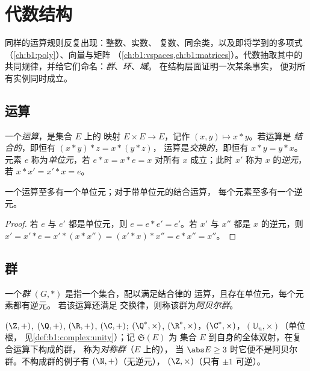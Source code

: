 \chapter{代数结构}\label{ch:b1:structures}

同样的运算规则反复出现：整数、实数、
复数、同余类，以及即将学到的多项式
（\cref{ch:b1:poly}）、向量与矩阵
（\cref{ch:b1:vspaces,ch:b1:matrices}）。代数抽取其中的
共同规律，并给它们命名：\emph{群}、\emph{环}、\emph{域}。
在结构层面证明一次某条事实，
便对所有实例同时成立。

\section{运算}

\begin{definition}\label{def:b1:structures:law}
一个\emph{运算}，是集合 $E$ 上的
映射 $E \times E \to E$，记作 $(x, y) \mapsto x * y$。若运算是
\emph{结合的}，即恒有 $(x*y)*z = x*(y*z)$，
运算是\emph{交换的}，即恒有 $x * y = y * x$。元素 $e$ 称为\emph{单位元}，若
$e * x = x * e = x$ 对所有 $x$ 成立；此时 $x'$ 称为 $x$ 的\emph{逆元}，若
$x * x' = x' * x = e$。
\end{definition}

\begin{proposition}[唯一性]\label{prop:b1:structures:unique}
一个运算至多有一个单位元；对于带单位元的结合运算，
每个元素至多有一个逆元。
\end{proposition}

\begin{proof}
若 $e$ 与 $e'$ 都是单位元，则 $e = e * e' = e'$。若 $x'$ 与 $x''$
都是 $x$ 的逆元，则 $x' = x' * e = x' * (x * x'') = (x' * x) * x'' = e * x''
= x''$。
\end{proof}

\section{群}

\begin{definition}[群]\label{def:b1:structures:group}
一个\emph{群} $(G, *)$ 是指一个集合，配以满足结合律的
运算，且存在单位元，每个元素都有逆元。
若该运算还满足
交换律，则称该群为\emph{阿贝尔群}。
\end{definition}

\begin{example}\label{ex:b1:structures:groups}
$(\Z, +)$, $(\Q, +)$, $(\R, +)$, $(\C, +)$; $(\Q^*, \times)$,
$(\R^*, \times)$，$(\C^*, \times)$，$(\mathbb{U}_n, \times)$（单位根，
见\cref{def:b1:complex:unity}）；记 $\mathfrak{S}(E)$ 为
集合 $E$ 到自身的全体双射，在复合运算下构成的群，
称为\emph{对称群}（$E$ 上的），
当 $\abs E \geq 3$ 时它便不是阿贝尔群。不构成群的例子有 $(\N, +)$（无逆元），
$(\Z, \times)$（只有 $\pm 1$ 可逆）。
\end{example}

